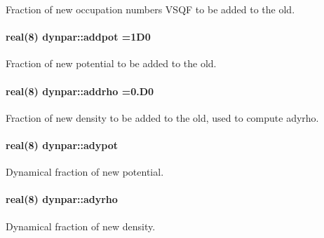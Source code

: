 Fraction of new occupation numbers \textquotesingle{}V\+S\+QF\textquotesingle{} to be added to the old. 

\paragraph[{\texorpdfstring{addpot}{addpot}}]{\setlength{\rightskip}{0pt plus 5cm}real(8) dynpar\+::addpot =1\+D0}\hypertarget{namespacedynpar_a471b6f8327d73d0d3fcfb99a045c4db4}{}\label{namespacedynpar_a471b6f8327d73d0d3fcfb99a045c4db4}


Fraction of new potential to be added to the old. 

\paragraph[{\texorpdfstring{addrho}{addrho}}]{\setlength{\rightskip}{0pt plus 5cm}real(8) dynpar\+::addrho =0.\+D0}\hypertarget{namespacedynpar_a786b46b00f5bc2733ee8a333f402c8b8}{}\label{namespacedynpar_a786b46b00f5bc2733ee8a333f402c8b8}


Fraction of new density to be added to the old, used to compute \textquotesingle{}adyrho\textquotesingle{}. 

\paragraph[{\texorpdfstring{adypot}{adypot}}]{\setlength{\rightskip}{0pt plus 5cm}real(8) dynpar\+::adypot}\hypertarget{namespacedynpar_acaa0cf6de41c1f3711fb9a20de59e903}{}\label{namespacedynpar_acaa0cf6de41c1f3711fb9a20de59e903}


Dynamical fraction of new potential. 

\paragraph[{\texorpdfstring{adyrho}{adyrho}}]{\setlength{\rightskip}{0pt plus 5cm}real(8) dynpar\+::adyrho}\hypertarget{namespacedynpar_a5df7c9c26d3c19fcaeed23c864679981}{}\label{namespacedynpar_a5df7c9c26d3c19fcaeed23c864679981}


Dynamical fraction of new density. 

